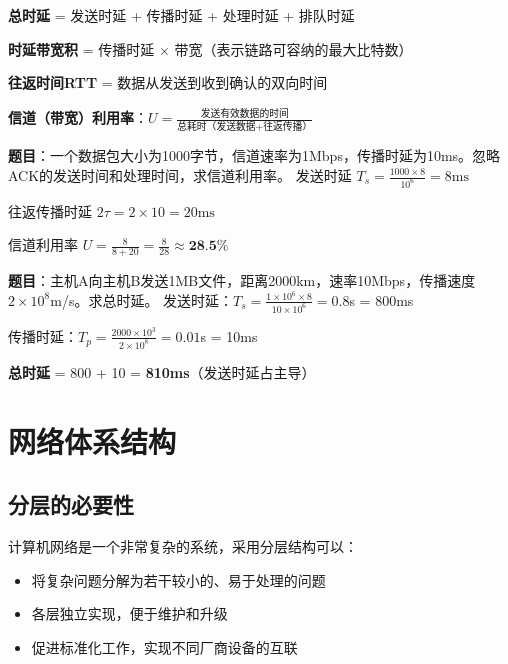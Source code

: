 \begin{formulabox}
\textbf{总时延} = 发送时延 + 传播时延 + 处理时延 + 排队时延

\textbf{时延带宽积} = 传播时延 $\times$ 带宽（表示链路可容纳的最大比特数）

\textbf{往返时间RTT} = 数据从发送到收到确认的双向时间

\textbf{信道（带宽）利用率}：$U = \frac{\text{发送有效数据的时间}}{\text{总耗时（发送数据+往返传播）}}$
\end{formulabox}

\begin{examplebox}[例题1.2b 信道利用率计算]
\textbf{题目}：一个数据包大小为1000字节，信道速率为1Mbps，传播时延为10ms。忽略ACK的发送时间和处理时间，求信道利用率。
\tcblower
发送时延 $T_s = \frac{1000 \times 8}{10^6} = 8\text{ms}$

往返传播时延 $2\tau = 2 \times 10 = 20\text{ms}$

信道利用率 $U = \frac{8}{8 + 20} = \frac{8}{28} \approx \textbf{28.5\%}$
\end{examplebox}

\begin{examplebox}[例题1.2 时延计算]
\textbf{题目}：主机A向主机B发送1MB文件，距离2000km，速率10Mbps，传播速度$2\times10^8$m/s。求总时延。
\tcblower
发送时延：$T_s = \frac{1\times10^6\times8}{10\times10^6} = 0.8$s = 800ms

传播时延：$T_p = \frac{2000\times10^3}{2\times10^8} = 0.01$s = 10ms

\textbf{总时延} = 800 + 10 = \textbf{810ms}（发送时延占主导）
\end{examplebox}

\section{网络体系结构}
\subsection{分层的必要性}
计算机网络是一个非常复杂的系统，采用分层结构可以：
\begin{itemize}[leftmargin=2em,itemsep=0pt]
    \item 将复杂问题分解为若干较小的、易于处理的问题
    \item 各层独立实现，便于维护和升级
    \item 促进标准化工作，实现不同厂商设备的互联
\end{itemize}

